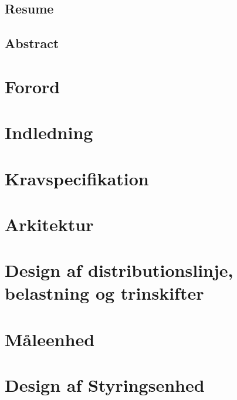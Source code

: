 \documentclass[a4paper, 11pt,oneside,openany, danish]{memoir} %
\begin{document}

\frontmatter

             
\section{Resume}
\section{Abstract}



\tableofcontents

\mainmatter
\chapter{Forord}  
                     
\chapter{Indledning}

\chapter{Kravspecifikation}




\chapter{Arkitektur}




\chapter{Design af distributionslinje, belastning og trinskifter}
\chapter{Måleenhed}


\chapter{Design af Styringsenhed}







\end{document}

